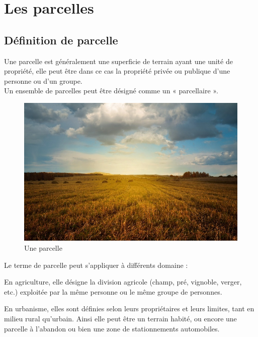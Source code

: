 \documentclass[12pt, openany]{report}
\begin{document}
\section{Les parcelles}

\subsection{Définition de parcelle}
Une parcelle est généralement une superficie de terrain ayant une unité de propriété, elle peut être dans ce cas la propriété privée ou publique d'une personne ou d'un groupe.\\
Un ensemble de parcelles peut être désigné comme un « parcellaire ». 

\begin{figure}[hp]
\centering
\includegraphics[scale=0.4]{parcelle2.jpg}
\caption{Une parcelle}
\end{figure}


Le terme de parcelle peut s'appliquer à différents domaine :

\begin{mylist}

\item En agriculture, elle désigne la division agricole (champ, pré, vignoble, verger, etc.) exploitée par la même personne ou le même groupe de personnes.


\item En urbanisme, elles sont définies selon leurs propriétaires et leurs limites, tant en milieu rural qu'urbain. Ainsi elle peut être un terrain habité, ou encore une parcelle à l'abandon ou bien une zone de stationnements automobiles. 

\end{mylist}
\end{document}
